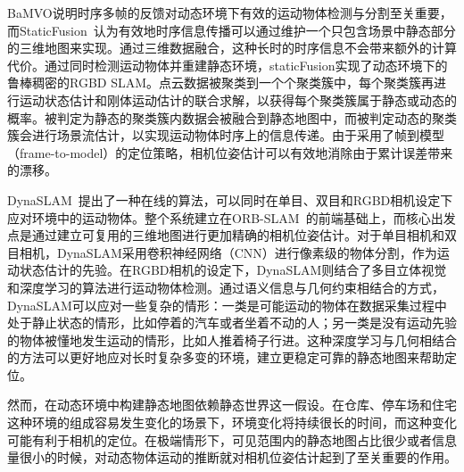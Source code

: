 BaMVO说明时序多帧的反馈对动态环境下有效的运动物体检测与分割至关重要，而StaticFusion~\cite{staticFusion}认为有效地时序信息传播可以通过维护一个只包含场景中静态部分的三维地图来实现。通过三维数据融合，这种长时的时序信息不会带来额外的计算代价。通过同时检测运动物体并重建静态环境，staticFusion实现了动态环境下的鲁棒稠密的RGBD SLAM。点云数据被聚类到一个个聚类簇中，每个聚类簇再进行运动状态估计和刚体运动估计的联合求解，以获得每个聚类簇属于静态或动态的概率。被判定为静态的聚类簇内数据会被融合到静态地图中，而被判定动态的聚类簇会进行场景流估计，以实现运动物体时序上的信息传递。由于采用了帧到模型（frame-to-model）的定位策略，相机位姿估计可以有效地消除由于累计误差带来的漂移。

DynaSLAM~\cite{DynaSLAM}提出了一种在线的算法，可以同时在单目、双目和RGBD相机设定下应对环境中的运动物体。整个系统建立在ORB-SLAM~\cite{orbslam2}的前端基础上，而核心出发点是通过建立可复用的三维地图进行更加精确的相机位姿估计。对于单目相机和双目相机，DynaSLAM采用卷积神经网络（CNN）进行像素级的物体分割，作为运动状态估计的先验。在RGBD相机的设定下，DynaSLAM则结合了多目立体视觉和深度学习的算法进行运动物体检测。通过语义信息与几何约束相结合的方式，DynaSLAM可以应对一些复杂的情形：一类是可能运动的物体在数据采集过程中处于静止状态的情形，比如停着的汽车或者坐着不动的人；另一类是没有运动先验的物体被懂地发生运动的情形，比如人推着椅子行进。这种深度学习与几何相结合的方法可以更好地应对长时复杂多变的环境，建立更稳定可靠的静态地图来帮助定位。

然而，在动态环境中构建静态地图依赖静态世界这一假设。在仓库、停车场和住宅这种环境的组成容易发生变化的场景下，环境变化将持续很长的时间，而这种变化可能有利于相机的定位。在极端情形下，可见范围内的静态地图占比很少或者信息量很小的时候，对动态物体运动的推断就对相机位姿估计起到了至关重要的作用。
